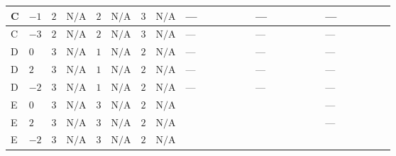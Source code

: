 \documentclass[8pt]{article}
\begin{document}
\begin{landscape}
\begin{longtable}{@{}llcccccc >{\raggedright\arraybackslash}p{0.21\linewidth} >{\raggedright\arraybackslash}p{0.21\linewidth} >{\raggedright\arraybackslash}p{0.21\linewidth}@{}}
\midrule
C & $-1$ & $2$ & $\text{N/A}$ & $2$ & $\text{N/A}$ & $3$ & $\text{N/A}$ & --- & --- & --- \\
\midrule
C & $-3$ & $2$ & $\text{N/A}$ & $2$ & $\text{N/A}$ & $3$ & $\text{N/A}$ & --- & --- & --- \\
\midrule
D & $0$ & $3$ & $\text{N/A}$ & $1$ & $\text{N/A}$ & $2$ & $\text{N/A}$ & --- & --- & --- \\
\midrule
D & $2$ & $3$ & $\text{N/A}$ & $1$ & $\text{N/A}$ & $2$ & $\text{N/A}$ & --- & --- & --- \\
\midrule
D & $-2$ & $3$ & $\text{N/A}$ & $1$ & $\text{N/A}$ & $2$ & $\text{N/A}$ & --- & --- & --- \\
\midrule
E & $0$ & $3$ & $\text{N/A}$ & $3$ & $\text{N/A}$ & $2$ & $\text{N/A}$ & \scriptsize\adjustbox{max width=\linewidth}{$\begin{gathered} +2 {\lambda_{12}^{(\times)}} {\lambda_{S_2}^{(1)}}\end{gathered}$} & \scriptsize\adjustbox{max width=\linewidth}{$\begin{gathered} -2 {\lambda_{12}^{(\times)}} {\lambda_{S_2}^{(A)}}\end{gathered}$} & --- \\
\midrule
E & $2$ & $3$ & $\text{N/A}$ & $3$ & $\text{N/A}$ & $2$ & $\text{N/A}$ & \scriptsize\adjustbox{max width=\linewidth}{$\begin{gathered} +2 {\lambda_{12}^{(\times)}} {\lambda_{S_2}^{(1)}}\end{gathered}$} & \scriptsize\adjustbox{max width=\linewidth}{$\begin{gathered} -2 {\lambda_{12}^{(\times)}} {\lambda_{S_2}^{(A)}}\end{gathered}$} & --- \\
\midrule
E & $-2$ & $3$ & $\text{N/A}$ & $3$ & $\text{N/A}$ & $2$ & $\text{N/A}$ & \scriptsize\adjustbox{max width=\linewidth}{$\begin{gathered} +2 {\lambda_{12}^{(\times)}} {\lambda_{S_2}^{(1)}}\end{gathered}$} & \scriptsize\adjustbox{max width=\linewidth}{$\begin{gathered} -2 {\lambda_{12}^{(\times)}} {\lambda_{S_2}^{(A)}}\end{gathered}$} & \scriptsize\adjustbox{max width=\linewidth}{$\begin{gathered} +{\lambda_{X_{7}}^{(2)}} (4 \left({\lambda_{X_{2}}}\right)^{*}+8 \left({\lambda_{X_{7}}^{(1)}}\right)^{*}+10 \left({\lambda_{X_{7}}^{(2)}}\right)^{*})\end{gathered}$} \\

\end{longtable}
\end{landscape}
\end{document}
